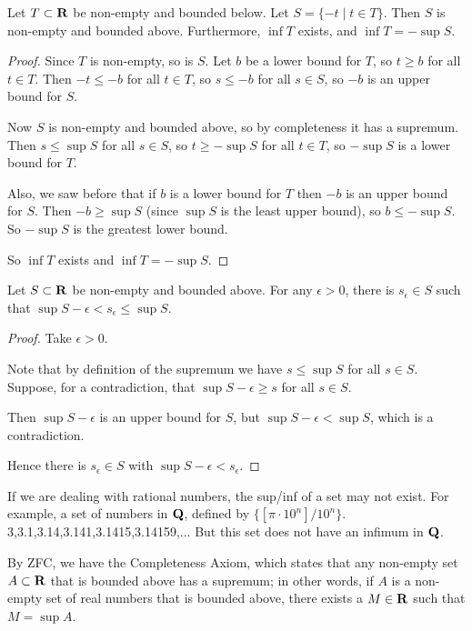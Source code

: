 \begin{proposition}
Let $T \subset \mathbf R$ be non-empty and bounded below. Let $S = \{-t \mid t \in T\}$. Then $S$ is non-empty and bounded above. Furthermore, $\inf T$ exists, and $\inf T = -\sup S$.
\end{proposition}
\begin{proof}
Since $T$ is non-empty, so is $S$. Let $b$ be a lower bound for $T$, so $t \ge b$ for all $t \in T$. Then $-t \le -b$ for all $t \in T$, so $s \le -b$ for all $s \in S$, so $-b$ is an upper
bound for $S$.

Now $S$ is non-empty and bounded above, so by completeness it has a
supremum. Then $s \le \sup S$ for all $s \in S$, so $t \ge -\sup S$ for all $t \in T$, so $-\sup S$ is a lower bound for $T$.

Also, we saw before that if $b$ is a lower bound for $T$ then $-b$ is an upper bound for $S$. Then $-b \ge \sup S$ (since $\sup S$ is the least upper bound), so $b \le -\sup S$. So $-\sup S$ is the greatest lower bound.

So $\inf T$ exists and $\inf T = -\sup S$.
\end{proof}

\begin{proposition}
Let $S\subset\mathbf R$ be non-empty and bounded above. For any $\epsilon > 0$, there is $s_\epsilon \in S$ such that $\sup S-\epsilon < s_\epsilon \le \sup S$.
\end{proposition}

\begin{proof}
Take $\epsilon > 0$.

Note that by definition of the supremum we have $s \le \sup S$ for all $s \in S$. Suppose, for a contradiction, that $\sup S-\epsilon \ge s$ for all $s \in S$.

Then $\sup S-\epsilon$ is an upper bound for $S$, but $\sup S-\epsilon < \sup S$, which is a contradiction.

Hence there is $s_\epsilon \in S$ with $\sup S-\epsilon<s_\epsilon$.
\end{proof}

If we are dealing with rational numbers, the sup/inf of a set may not exist. For example, a set of numbers in $\mathbf Q$, defined by $\{[\pi\cdot10^n]/10^n\}$.
3,3.1,3.14,3.141,3.1415,3.14159,...
But this set does not have an infimum in $\mathbf Q$.

By ZFC, we have the Completeness Axiom, which states that any non-empty set $A \subset \mathbf R$ that is bounded above has a supremum; in other words, if $A$ is a non-empty set of real numbers that is bounded above, there exists a $M \in \mathbf R$ such that $M = \sup A$.

